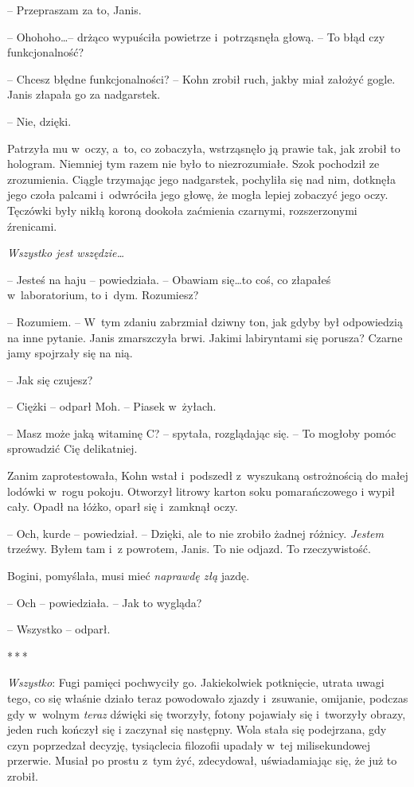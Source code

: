 \documentclass[oneside,polish,11pt,sfheadings]{mwbk}
\newcommand{\threeast}{\bigskip\par\centerline{*\,*\,*}\medskip\par}%
\begin{document}
-- Przepraszam za to, Janis.

-- Ohohoho\ldots -- drżąco wypuściła powietrze i~potrząsnęła głową. -- To błąd
czy funkcjonalność?

-- Chcesz błędne funkcjonalności? -- Kohn zrobił ruch, jakby miał założyć
gogle. Janis złapała go za nadgarstek.

-- Nie, dzięki.

Patrzyła mu w~oczy, a~to, co zobaczyła, wstrząsnęło ją prawie tak, jak
zrobił to hologram. Niemniej tym razem nie było to niezrozumiałe. Szok
pochodził ze zrozumienia. Ciągle trzymając jego nadgarstek, pochyliła
się nad nim, dotknęła jego czoła palcami i~odwróciła jego głowę, że
mogła lepiej zobaczyć jego oczy. Tęczówki były nikłą koroną dookoła
zaćmienia czarnymi, rozszerzonymi źrenicami.

\emph{Wszystko jest wszędzie\ldots}

-- Jesteś na haju -- powiedziała. -- Obawiam się\ldots to coś, co złapałeś w~laboratorium, to i~dym. Rozumiesz?

-- Rozumiem. -- W~tym zdaniu zabrzmiał dziwny ton, jak gdyby był
odpowiedzią na inne pytanie. Janis zmarszczyła brwi. Jakimi labiryntami
się porusza? Czarne jamy spojrzały się na nią.

-- Jak się czujesz?

-- Ciężki -- odparł Moh. -- Piasek w~żyłach.

-- Masz może jaką witaminę C? -- spytała, rozglądając się. -- To mogłoby
pomóc sprowadzić Cię delikatniej.

Zanim zaprotestowała, Kohn wstał i~podszedł z~wyszukaną ostrożnością do
małej lodówki w~rogu pokoju. Otworzył litrowy karton soku pomarańczowego
i wypił cały. Opadł na łóżko, oparł się i~zamknął oczy.

-- Och, kurde -- powiedział. -- Dzięki, ale to nie zrobiło żadnej różnicy.
\emph{Jestem} trzeźwy. Byłem tam i~z powrotem, Janis. To nie odjazd. To
rzeczywistość.

Bogini, pomyślała, musi mieć \emph{naprawdę złą} jazdę.

-- Och -- powiedziała. -- Jak to wygląda?

-- Wszystko -- odparł.
  \threeast 

\emph{Wszystko}: Fugi pamięci pochwyciły go. Jakiekolwiek potknięcie,
utrata uwagi tego, co się właśnie działo teraz powodowało zjazdy i~zsuwanie, omijanie, podczas gdy w~wolnym \emph{teraz} dźwięki się
tworzyły, fotony pojawiały się i~tworzyły obrazy, jeden ruch kończył się
i zaczynał się następny. Wola stała się podejrzana, gdy czyn poprzedzał
decyzję, tysiąclecia filozofii upadały w~tej milisekundowej przerwie.
Musiał po prostu z~tym żyć, zdecydował, uświadamiając się, że już to
zrobił.
\end{document}
